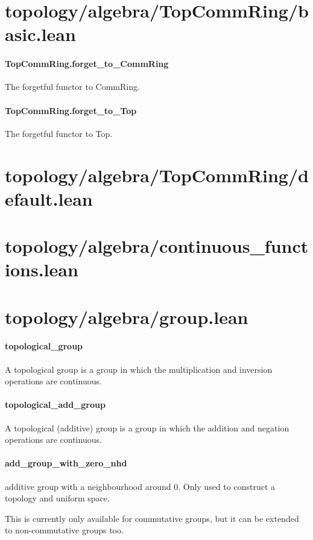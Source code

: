 \documentclass{article}
\begin{document}
\section{topology/algebra/TopCommRing/basic.lean}\paragraph{TopCommRing.forget\_to\_CommRing}
\par
The forgetful functor to CommRing.
\paragraph{TopCommRing.forget\_to\_Top}
\par
The forgetful functor to Top.
\section{topology/algebra/TopCommRing/default.lean}\section{topology/algebra/continuous\_functions.lean}\section{topology/algebra/group.lean}\paragraph{topological\_group}
\par
A topological group is a group in which the multiplication and inversion operations are
continuous.
\paragraph{topological\_add\_group}
\par
A topological (additive) group is a group in which the addition and negation operations are
continuous.
\paragraph{add\_group\_with\_zero\_nhd}
\par
additive group with a neighbourhood around 0.
Only used to construct a topology and uniform space.
\par
This is currently only available for commutative groups, but it can be extended to
non-commutative groups too.
\end{document}

